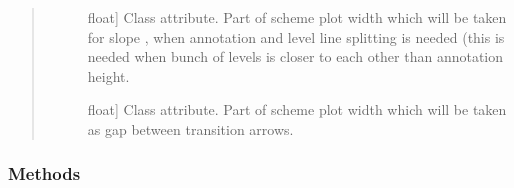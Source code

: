 \documentclass[letterpaper,10pt,english]{sphinxmanual}
\begin{document}
\begin{fulllineitems}
\begin{quote}
\begin{description}
\begin{description}
\item[{}] \leavevmode{[}float{]}
Class attribute. Part of scheme plot width which will be taken for slope , when annotation and level line splitting
is needed (this is needed when bunch of levels is closer to each other than annotation height.

\item[{}] \leavevmode{[}float{]}
Class attribute. Part of scheme plot width which will be taken as gap between transition arrows.

\end{description}

\end{description}\end{quote}
\subsubsection*{Methods}


\begin{savenotes}\sphinxatlongtablestart\begin{longtable}{}
\hline

\endfirsthead

%
{}\\
\hline

\endhead

\hline
{}\\
\endfoot

\endlastfoot


\end{longtable}
\end{savenotes}
\end{fulllineitems}
\end{document}
